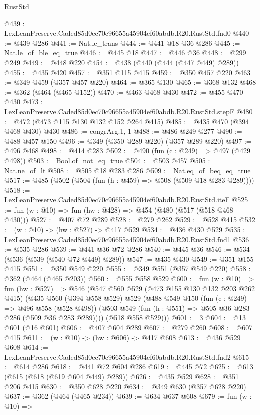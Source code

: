 \begin{lexlean}{RustStd}
\begin{coremodule}
@439 := LexLeanPreserve.Caded85d0ec70c96655a45904ef60abdb.R20.RustStd.fnd0
@440 := @439 @286
@441 := Nat.le_trans
@444 := @441 @18 @36 @286
@445 := Nat.le_of_ble_eq_true
@446 := @445 @18
@447 := @446 @36
@448 := @299 @249
@449 := @448 @220
@454 := @438 (@440 (@444 (@447 @449) @289))
@455 := @435 @420
@457 := @351 @115 @415
@459 := @350 @457 @220
@463 := @349 @459 (@357 @457 @220)
@464 := @365 @130
@465 := @368 @132
@468 := @362 (@464 (@465 @152))
@470 := @463 @468 @430
@472 := @455 @470 @430
@473 := LexLeanPreserve.Caded85d0ec70c96655a45904ef60abdb.R20.RustStd.stepF
@480 := @472 (@473 @115 @130 @132 @152 @264 @415)
@485 := @435 @470 (@394 @468 @430) @430
@486 := congrArg.{1, 1}
@488 := @486 @249 @277
@490 := @488 @457 @150
@496 := @349 (@350 @289 @220) (@357 @289 @220)
@497 := @496 @468
@498 := @414 @283
@502 := @490 (fun (c : @249) => @497 (@429 @498))
@503 := Bool.of_not_eq_true
@504 := @503 @457
@505 := Nat.ne_of_lt
@508 := @505 @18 @283 @286
@509 := Nat.eq_of_beq_eq_true
@517 := @485 (@502 (@504 (fun (h : @459) => @508 (@509 @18 @283 @289))))
@518 := LexLeanPreserve.Caded85d0ec70c96655a45904ef60abdb.R20.RustStd.iteF
@525 := fun (w : @10) => fun (hw : @428) => @454 (@480 (@517 (@518 @468 @430)))
@527 := @407 @72 @289
@528 := @279 @262
@529 := @528 @415
@532 := (w : @10) -> (hw : @527) -> @417 @529
@534 := @436 @430 @529
@535 := LexLeanPreserve.Caded85d0ec70c96655a45904ef60abdb.R20.RustStd.fnd1
@536 := @535 @286
@539 := @441 @36 @72 @286
@540 := @445 @36
@546 := @534 (@536 (@539 (@540 @72 @449) @289))
@547 := @435 @430
@549 := @351 @155 @415
@551 := @350 @549 @220
@555 := @349 @551 (@357 @549 @220)
@558 := @362 (@464 (@465 @203))
@560 := @555 @558 @529
@600 := fun (w : @10) =>
  fun (hw : @527) =>
  @546
    (@547
      @560
      @529
      (@473 @155 @130 @132 @203 @262 @415)
      (@435
        @560
        (@394 @558 @529)
        @529
        (@488
          @549
          @150
          (fun (c : @249) => @496 @558 (@528 @498))
          (@503 @549 (fun (h : @551) => @505 @36 @283 @286 (@509 @36 @283 @289))))
        (@518 @558 @529)))
@601 := 3
@604 := @13 @601 (@16 @601)
@606 := @407 @604 @289
@607 := @279 @260
@608 := @607 @415
@611 := (w : @10) -> (hw : @606) -> @417 @608
@613 := @436 @529 @608
@614 := LexLeanPreserve.Caded85d0ec70c96655a45904ef60abdb.R20.RustStd.fnd2
@615 := @614 @286
@618 := @441 @72 @604 @286
@619 := @445 @72
@625 := @613 (@615 (@618 (@619 @604 @449) @289))
@626 := @435 @529
@628 := @351 @206 @415
@630 := @350 @628 @220
@634 := @349 @630 (@357 @628 @220)
@637 := @362 (@464 (@465 @234))
@639 := @634 @637 @608
@679 := fun (w : @10) =>

\end{coremodule}
\end{lexlean}
